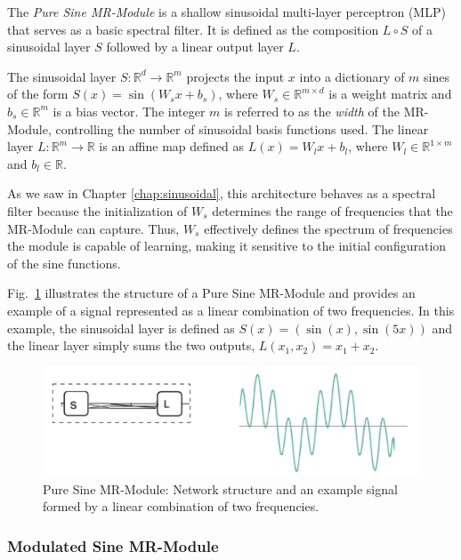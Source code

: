 The \textit{Pure Sine MR-Module} is a shallow sinusoidal multi-layer perceptron (MLP) that serves as a basic spectral filter. It is defined as the composition \( L \circ S \) of a sinusoidal layer \( S \) followed by a linear output layer \( L \). 

The sinusoidal layer \( S\!:\!\mathbb{R}^d\!\to\! \mathbb{R}^m \) projects the input \( x \) into a dictionary of \( m \) sines of the form \( S(x) = \sin\left(W_s x + b_s\right) \), where \( W_s \in \mathbb{R}^{m \times d} \) is a weight matrix and \( b_s \in \mathbb{R}^m \) is a bias vector. The integer \( m \) is referred to as the \textit{width} of the MR-Module, controlling the number of sinusoidal basis functions used. The linear layer \( L\!:\!\mathbb{R}^m\!\to\! \mathbb{R} \) is an affine map defined as \( L(x) = W_l x + b_l \), where \( W_l \in \mathbb{R}^{1 \times m} \) and \( b_l \in \mathbb{R} \).

As we saw in Chapter \ref{chap:sinusoidal}, this architecture behaves as a spectral filter because the initialization of \( W_s \) determines the range of frequencies that the MR-Module can capture. 
Thus, \( W_s \) effectively defines the spectrum of frequencies the module is capable of learning, making it sensitive to the initial configuration of the sine functions.

Fig.~\ref{f:pure-sine} illustrates the structure of a Pure Sine MR-Module and provides an example of a signal represented as a linear combination of two frequencies. In this example, the sinusoidal layer is defined as \( S(x) = (\sin(x), \sin(5x)) \) and the linear layer simply sums the two outputs, \( L(x_1, x_2) = x_1 + x_2 \).

\begin{figure}[!h]
\centering
\includegraphics[width=0.8\linewidth]{img/ch4/pure-sine.png}
\caption{Pure Sine MR-Module: Network structure and an example signal formed by a linear combination of two frequencies.}
\label{f:pure-sine}
\end{figure}

\subsubsection{Modulated Sine MR-Module}

